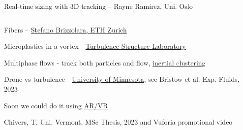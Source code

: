\begin{frame}[label=app-27]{Real-time sizing with 3D tracking -- Rayne Ramirez, Uni. Oslo}
  \begin{columns}
 \end{columns}
\end{frame}
    
\begin{frame}[label=app-28]{Fibers -- \href{https://www.dropbox.com/s/y5gf55qqeyq5ljr/fibers.mp4?raw=1}{Stefano Brizzolara, ETH Zurich}}
\begin{center}
\end{center}    
\end{frame}

\begin{frame}[label=app-29]{Microplastics in a vortex - \href{https://www.dropbox.com/s/in5ewv968dy9j3q/microplastics.mp4?raw=1}{Turbulence Structure Laboratory}}
    \centering {}
\end{frame}

    
\begin{frame}[label=app-18a]{Multiphase flows - track both particles and flow, \href{}{inertial clustering}}
\begin{center}
\end{center}
\end{frame}
    
    
\begin{frame}[label=app-30]{Drone vs turbulence - \href{https://www.dropbox.com/s/3lav5rf6s8su6f5/drone.mp4?raw=1}{University of Minnesota}, see Bristow et al. Exp. Fluids, 2023}
    \begin{center}
    \end{center}
\end{frame}
    
\begin{frame}[label=app-31a]{Soon we could do it using \href{https://www.dropbox.com/s/ckis9r6omd5y4fq/vuforia.mp4?raw=1}{AR/VR}}
   \begin{center} 
    Chivers, T. Uni. Vermont, MSc Thesis, 2023 and Vuforia promotional video
    \end{center}
\end{frame}

